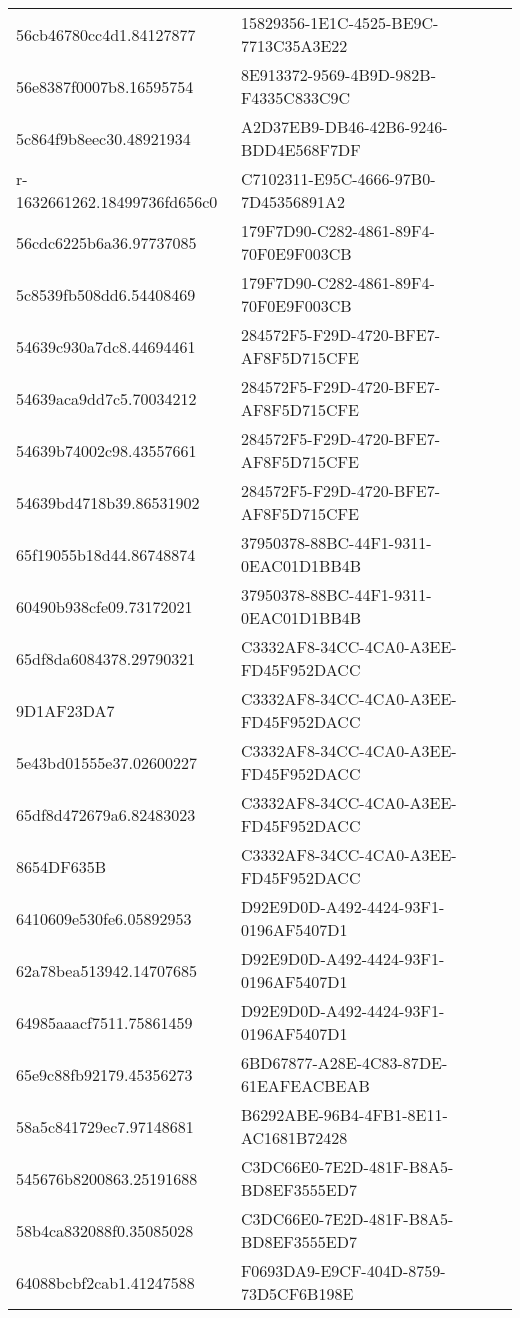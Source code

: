 \begin{tabular}{ll}
56cb46780cc4d1.84127877 & 15829356-1E1C-4525-BE9C-7713C35A3E22 \\
56e8387f0007b8.16595754 & 8E913372-9569-4B9D-982B-F4335C833C9C \\
5c864f9b8eec30.48921934 & A2D37EB9-DB46-42B6-9246-BDD4E568F7DF \\
r-1632661262.18499736fd656c0 & C7102311-E95C-4666-97B0-7D45356891A2 \\
56cdc6225b6a36.97737085 & 179F7D90-C282-4861-89F4-70F0E9F003CB \\
5c8539fb508dd6.54408469 & 179F7D90-C282-4861-89F4-70F0E9F003CB \\
54639c930a7dc8.44694461 & 284572F5-F29D-4720-BFE7-AF8F5D715CFE \\
54639aca9dd7c5.70034212 & 284572F5-F29D-4720-BFE7-AF8F5D715CFE \\
54639b74002c98.43557661 & 284572F5-F29D-4720-BFE7-AF8F5D715CFE \\
54639bd4718b39.86531902 & 284572F5-F29D-4720-BFE7-AF8F5D715CFE \\
65f19055b18d44.86748874 & 37950378-88BC-44F1-9311-0EAC01D1BB4B \\
60490b938cfe09.73172021 & 37950378-88BC-44F1-9311-0EAC01D1BB4B \\
65df8da6084378.29790321 & C3332AF8-34CC-4CA0-A3EE-FD45F952DACC \\
9D1AF23DA7 & C3332AF8-34CC-4CA0-A3EE-FD45F952DACC \\
5e43bd01555e37.02600227 & C3332AF8-34CC-4CA0-A3EE-FD45F952DACC \\
65df8d472679a6.82483023 & C3332AF8-34CC-4CA0-A3EE-FD45F952DACC \\
8654DF635B & C3332AF8-34CC-4CA0-A3EE-FD45F952DACC \\
6410609e530fe6.05892953 & D92E9D0D-A492-4424-93F1-0196AF5407D1 \\
62a78bea513942.14707685 & D92E9D0D-A492-4424-93F1-0196AF5407D1 \\
64985aaacf7511.75861459 & D92E9D0D-A492-4424-93F1-0196AF5407D1 \\
65e9c88fb92179.45356273 & 6BD67877-A28E-4C83-87DE-61EAFEACBEAB \\
58a5c841729ec7.97148681 & B6292ABE-96B4-4FB1-8E11-AC1681B72428 \\
545676b8200863.25191688 & C3DC66E0-7E2D-481F-B8A5-BD8EF3555ED7 \\
58b4ca832088f0.35085028 & C3DC66E0-7E2D-481F-B8A5-BD8EF3555ED7 \\
64088bcbf2cab1.41247588 & F0693DA9-E9CF-404D-8759-73D5CF6B198E \\

\end{tabular}
